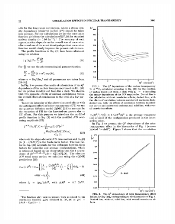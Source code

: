 \begin{figure}[h]
    \centering
    \begin{subfigure}[b]{0.45\textwidth}
        \centering
        \includegraphics[width=\textwidth]{chap1/frankfurt_transparency_without_CT.pdf}
        \label{fig:frankfurt_transparency_without_CT}
    \end{subfigure}
    \begin{subfigure}[b]{0.45\textwidth}
        \centering

\end{subfigure}
\end{figure}
